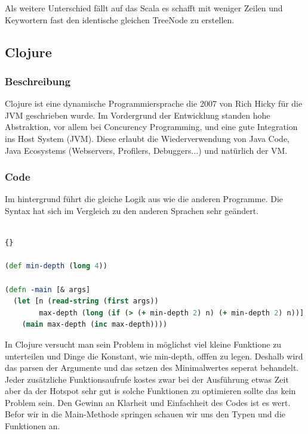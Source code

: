 \documentclass{fancydocument}
\begin{document}
Als weitere Unterschied f\"allt auf das Scala es schafft mit weniger
Zeilen und Keywortern fast den identische gleichen TreeNode zu
erstellen.

\subsection{Clojure}
\subsubsection{Beschreibung}

Clojure ist eine dynamische Programmiersprache die 2007 von Rich Hicky
für die JVM geschrieben wurde. Im Vordergrund der Entwicklung standen
hohe Abstraktion, vor allem bei Concurency Programming, und eine gute
Integration ins Host System (JVM). Diese erlaubt die Wiederverwendung von
Java Code, Java Ecosystems (Webservers, Profilers, Debuggers...) und natürlich der VM.

\subsubsection{Code}


Im hintergrund f\"uhrt die gleiche Logik aus wie die anderen
Programme. Die Syntax hat sich im Vergleich zu den anderen Sprachen
sehr ge\"andert. 
\\\\

\begin{lstlisting}[language=Clojure,caption=Simple main]{}

(def min-depth (long 4))

(defn -main [& args]
  (let [n (read-string (first args))
        max-depth (long (if (> (+ min-depth 2) n) (+ min-depth 2) n))]
    (main max-depth (inc max-depth))))
\end{lstlisting}

In Clojure versucht man sein Problem in m\"oglichst viel kleine
Funktione zu unterteilen und Dinge die Konstant, wie min-depth, offfen
zu legen. Deshalb wird das parsen der Argumente und
das setzen des Minimalwertes seperat behandelt. Jeder zus\"atzliche
Funktionsaufrufe kostes zwar bei der Ausf\"uhrung etwas Zeit aber da
der Hotspot sehr gut is solche Funktionen zu optimieren sollte das
kein Problem sein. Den Gewinn an Klarheit und Einfachheit des Codes
ist es wert.\\
\newline
Befor wir in die Main-Methode springen schauen wir uns den Typen und
die Funktionen an.
\end{document}
